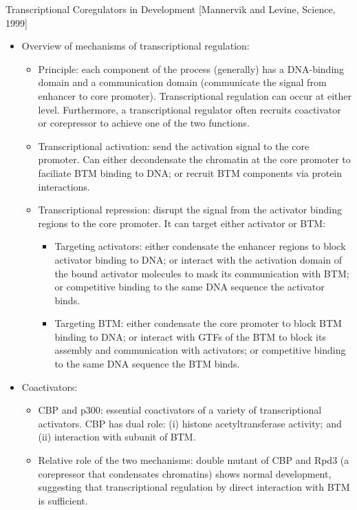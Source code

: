 \documentclass{report}
\begin{document}
Transcriptional Coregulators in Development [Mannervik and Levine, Science, 1999]
\begin{itemize}
	\item Overview of mechanisms of transcriptional regulation: 
	\begin{itemize}
		
		\item Principle: each component of the process (generally) has a DNA-binding domain and a communication domain (communicate the signal from enhancer to core promoter). Transcriptional regulation can occur at either level. Furthermore, a transcriptional regulator often recruits coactivator or corepressor to achieve one of the two functions. 
		
		\item Transcriptional activation: send the activation signal to the core promoter. Can either decondensate the chromatin at the core promoter to faciliate BTM binding to DNA; or recruit BTM components via protein interactions. 
		
		\item Transcriptional repression: disrupt the signal from the activator binding regions to the core promoter. It can target either activator or BTM: 
		\begin{itemize}
			\item Targeting activators: either condensate the enhancer regions to block activator binding to DNA; or interact with the activation domain of the bound activator molecules to mask its communication with BTM; or competitive binding to the same DNA sequence the activator binds.  
			\item Targeting BTM: either condensate the core promoter to block BTM binding to DNA; or interact with GTFs of the BTM to block its assembly and communication with activators; or competitive binding to the same DNA sequence the BTM binds. 
		\end{itemize}
		
	\end{itemize}
	
	\item Coactivators: 
	\begin{itemize}
		\item CBP and p300: essential coactivators of a variety of transcriptional activators. CBP has dual role: (i) histone acetyltransferase activity; and (ii) interaction with subunit of BTM. 
		\item Relative role of the two mechanisms: double mutant of CBP and Rpd3 (a corepressor that condensates chromatins) shows normal development, suggesting that transcriptional regulation by direct interaction with BTM is sufficient. 
	\end{itemize}
	

\end{itemize}
\end{document}
